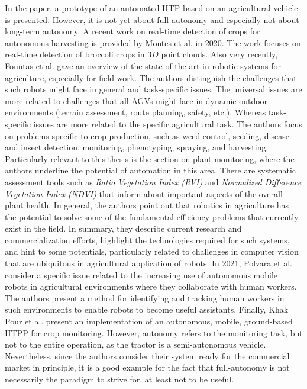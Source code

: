 \documentclass[english, master, utf8]{base/thesis_KBS}
\begin{document}
In the paper, a prototype of an automated HTP based on an agricultural vehicle is presented. However, it is not yet about full autonomy and especially not about long-term autonomy.
\newline
A recent work on real-time detection of crops for autonomous harvesting is provided by Montes et al. \cite{Montes:2020} in 2020. The work focuses on real-time detection of broccoli crops
in $3D$ point clouds.\newline
Also very recently, Fountas et al. \cite{Fountas:2020} gave an overview of the state of the art in robotic systems for agriculture, especially for field work. The authors distinguish
the challenges that such robots might face in general and task-specific issues. The universal issues are more related to challenges that all AGVs might face in dynamic outdoor
environments (terrain assessment, route planning, safety, etc.). \cite{Fountas:2020} Whereas task-specific issues are more related to the specific agricultural task. The authors
focus on problems specific to crop production, such as weed control, seeding, disease and insect detection, monitoring, phenotyping, spraying, and harvesting. Particularly relevant
to this thesis is the section on plant monitoring, where the authors underline the potential of automation in this area. There are systematic assessment tools such as
\textit{Ratio Vegetation Index (RVI)} and \textit{Normalized Difference Vegetation Index (NDVI)} that inform about important aspects of the overall plant health. \cite{Fountas:2020}
In general, the authors point out that robotics in agriculture has the potential to solve some of the fundamental efficiency problems that currently exist in the field. In summary,
they describe current research and commercialization efforts, highlight the technologies required for such systems, and hint to some potentials, particularly related to challenges
in computer vision that are ubiquitous in agricultural application of robots.\newline
In 2021, Polvara et al. \cite{Polvara:2021} consider a specific issue related to the increasing use of autonomous mobile robots in agricultural environments where they collaborate with
human workers. The authors present a method for identifying and tracking human workers in such environments to enable robots to become useful assistants.\newline
Finally, Khak Pour et al. \cite{KhakPour:2021} present an implementation of an autonomous, mobile, ground-based HTPP for crop monitoring. However, autonomy refers to the
monitoring task, but not to the entire operation, as the tractor is a semi-autonomous vehicle. Nevertheless, since the authors consider their system ready for the commercial
market in principle, it is a good example for the fact that full-autonomy is not necessarily the paradigm to strive for, at least not to be useful.\newline
\end{document}
